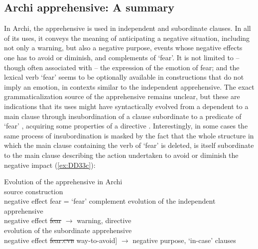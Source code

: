 \documentclass[output=paper,colorlinks,citecolor=brown]{langscibook}
\begin{document}
\subsection{Archi apprehensive: A summary}
\label{subsec:Aapprehensive}
 
In Archi, the apprehensive is used in independent and subordinate clauses. In all of its uses, it conveys the meaning of anticipating a negative situation, including not only a warning, but also a negative purpose, events whose negative effects one has to avoid or diminish, and complements of `fear'. It is not limited to -- though often associated with -- the expression of the emotion of fear; and the lexical verb `fear' seems to be optionally available in constructions that do not imply an emotion, in contexts similar to the independent apprehensive. The exact grammaticalization source of the apprehensive remains unclear, but these are indications that its uses might have syntactically evolved from a dependent to a main clause through insubordination of a clause subordinate to a predicate of `fear' , acquiring some properties of a directive . Interestingly, in some cases the same process of insubordination is masked by the fact that the whole structure in which the main clause containing the verb of `fear' is deleted, is itself subordinate to the main clause describing the action undertaken to avoid or diminish the negative impact (\ref{ex:DD33c}):%
 
    \ea \label{ex:DD33} \textnormal{Evolution of the apprehensive in Archi} \\
\ea \label{ex:DD33a} \textnormal{source construction} \\
\textnormal{{\ob\ob}negative effect{\cb} fear{\cb} = `fear' complement}
\ex \label{ex:DD33b} \textnormal{evolution of the independent apprehensive} \\
\textnormal{{\ob\ob}negative effect{\cb} \sout{fear}{\cb} $\rightarrow$ warning, directive} \\
\ex \label{ex:DD33c}\textnormal{evolution of the subordinate apprehensive }\\
\textnormal{{\ob\ob\ob}negative effect{\cb} \sout{fear.\textsc{cvb}}{\cb} way-to-avoid] $\rightarrow$ negative purpose, `in-case' clauses} \\
\z
\z
\end{document}
